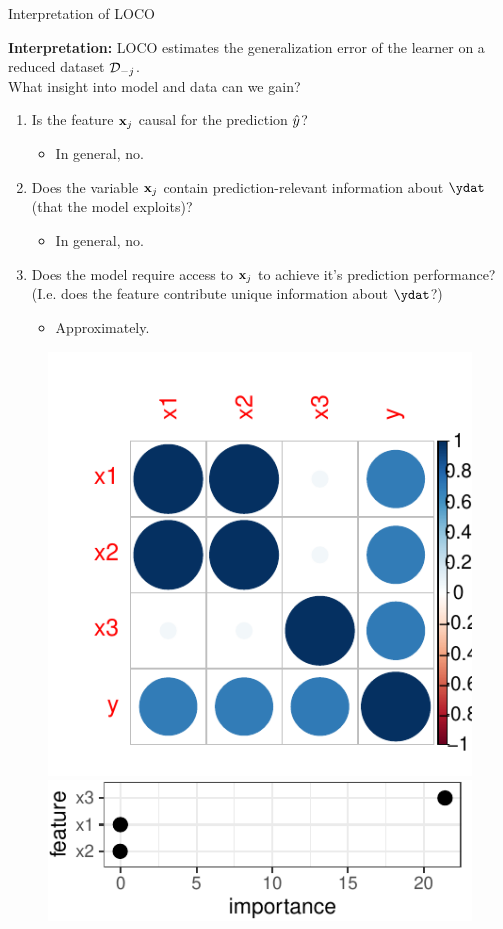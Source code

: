 \documentclass[11pt,compress,t,notes=noshow, xcolor=table]{beamer}
\begin{document}
\begin{vbframe}{Interpretation of LOCO}

\textbf{Interpretation:} LOCO estimates the generalization error of the learner on a reduced dataset $\D_{-j}$.\\
\lz
What insight into model and data can we gain?
\begin{enumerate}
    \item Is the feature $\xj$ causal for the prediction $\yh$?
    \begin{itemize}
      \item In general, no.
    \end{itemize}
    \item Does the variable $\xj$ contain prediction-relevant information about $\ydat$ (that the model exploits)?
    \begin{itemize}
      \item In general, no.
    \end{itemize}
    \item Does the model require access to $\xj$ to achieve it's prediction performance? (I.e. does the feature contribute unique information about $\ydat$?)
    \begin{itemize}
      \item Approximately.
    \end{itemize}
\end{enumerate}

\framebreak

\begin{figure}
\centering
\hfill
	\includegraphics[width=0.25\linewidth]{figure_man/simulation_corr.pdf} 
\hfill
  \includegraphics[width=0.5\linewidth]{figure_man/simulation_loco}
  \hfill
\end{figure}


\end{vbframe}
\end{document}
